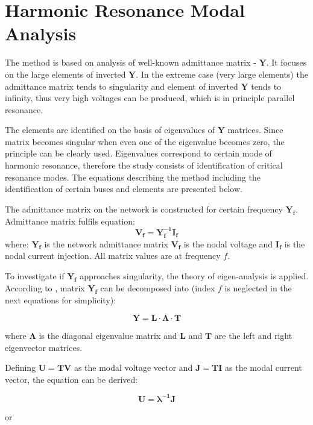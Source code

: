 \documentclass[12pt]{report} %
\begin{document}
\section{Harmonic Resonance Modal Analysis} \label{sec:theoryhrma}
The method is based on analysis of well-known admittance matrix - $\bm{Y}$. It focuses on the large elements of inverted $\bm{Y}$. In the extreme case (very large elements) the admittance matrix tends to singularity and element of inverted $\bm{Y}$ tends to infinity, thus very high voltages can be produced, which is in principle parallel resonance.

The elements are identified on the basis of eigenvalues of $\bm{Y}$ matrices. Since matrix becomes singular when even one of the eigenvalue becomes zero, the principle can be clearly used. Eigenvalues correspond to certain mode of harmonic resonance, therefore the study consists of identification of critical resonance modes. The equations describing the method including the identification of certain buses and elements are presented below.

The admittance matrix on the network is constructed for certain frequency $\bm{Y_f}$. Admittance matrix fulfils equation:
\begin{equation}
	\bm{V_f=Y_f^{-1}I_f}
\end{equation}
where: $\bm{Y_f}$ is the network admittance matrix $\bm{V_f}$ is the nodal voltage and $\bm{I_f}$ is the nodal current injection. All matrix values are at frequency $f$.

To investigate if $\bm{Y_f}$ approaches singularity, the theory of eigen-analysis is applied. According to \cite{bellman1970}, matrix $\bm{Y_f}$ can be decomposed into (index $f$ is neglected in the next equations for simplicity):

\begin{equation} \label{eq:hrma1}
	\bm{Y=L\cdot\Lambda\cdot T}
\end{equation}

where $\bm{\Lambda}$ is the diagonal eigenvalue matrix and $\bm{L}$ and $\bm{T}$ are the left and right eigenvector matrices.

Defining $\bm{U=TV}$ as the modal voltage vector and $\bm{J=TI}$ as the modal current vector, the equation can be derived:

\begin{equation}
	\bm{U=\lambda^{-1}J}
\end{equation}

or
\end{document}
